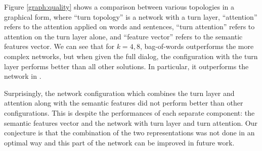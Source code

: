 Figure \ref{graph:quality} shows a comparison between various topologies 
in a graphical form, where ``turn topology'' is a network with a turn layer, 
``attention'' refers to the attention applied on words and sentences, 
``turn attention'' refers to attention on the turn layer alone, and 
``feature vector'' refers to the semantic features vector. 
We can see that for $k=4,8$, bag-of-words outperforms the more complex 
networks, but when given the full dialog, the configuration with the turn layer performs 
better than all other solutions. 
In particular, it outperforms the network in \cite{attention}. 


Surprisingly, the network configuration which combines the turn layer and attention along with the 
semantic features did not perform better than other configurations. 
This is despite the performances of each separate component: the semantic features vector and 
the network with turn layer and turn attention. 
Our conjecture is that the combination of the two representations was not done 
in an optimal way and this part of the network can be improved in future work. 



